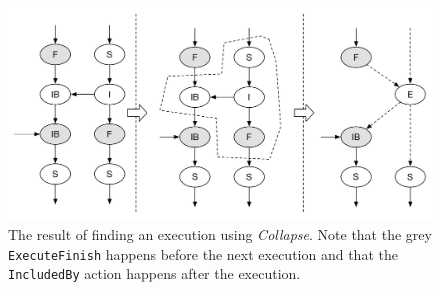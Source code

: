 	\begin{figure}
		\centering
		\includegraphics[width=\textwidth]{7previous/images/collapse.pdf}
		\caption{The result of finding an execution using \textit{Collapse}. Note that the grey  \texttt{ExecuteFinish} happens before the next execution and that the \texttt{IncludedBy} action happens after the execution.}
		\label{fig:problem:collapse}
	\end{figure}
	
	
	
	